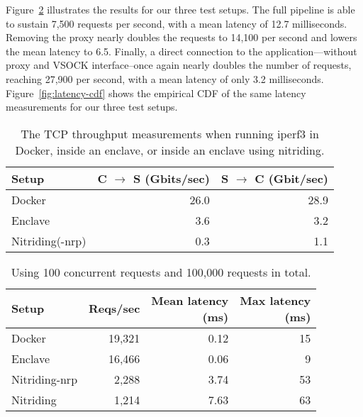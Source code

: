 Figure~\ref{fig:latency-msmts} illustrates the results for our three test
setups.  The full pipeline is able to sustain 7,500 requests per second, with a
mean latency of 12.7 milliseconds.  Removing the proxy nearly doubles the
requests to 14,100 per second and lowers the mean latency to 6.5.  Finally, a
direct connection to the application---without proxy and VSOCK interface--once
again nearly doubles the number of requests, reaching 27,900 per second, with a
mean latency of only 3.2 milliseconds.  Figure~\ref{fig:latency-cdf} shows the
empirical CDF of the same latency measurements for our three test setups.

\begin{table}[t]
    \centering
    \begin{tabular}{l r r}
    \toprule
      Setup & C $\rightarrow$ S (Gbits/sec) & S $\rightarrow$ C (Gbit/sec) \\
    \midrule
      Docker          & 26.0 & 28.9 \\
      Enclave         &  3.6 &  3.2 \\
      Nitriding(-nrp) &  0.3 &  1.1 \\
    \bottomrule
    \end{tabular}
    \caption{The TCP throughput measurements when running iperf3 in Docker,
      inside an enclave, or inside an enclave using nitriding.}
    \label{fig:iperf3}
\end{table}

\begin{table}[t]
    \centering
    \begin{tabular}{l r r r}
    \toprule
      Setup & Reqs/sec & \makecell[r]{Mean latency\\(ms)} &
                         \makecell[r]{Max latency\\(ms)} \\
    \midrule
      Docker        & 19,321 &  0.12 & 15 \\
      Enclave       & 16,466 &  0.06 &  9 \\
      Nitriding-nrp &  2,288 &  3.74 & 53 \\
      Nitriding     &  1,214 &  7.63 & 63 \\
    \bottomrule
    \end{tabular}
    \caption{Using 100 concurrent requests and 100,000 requests in total.}
    \label{fig:latency-msmts}
\end{table}


